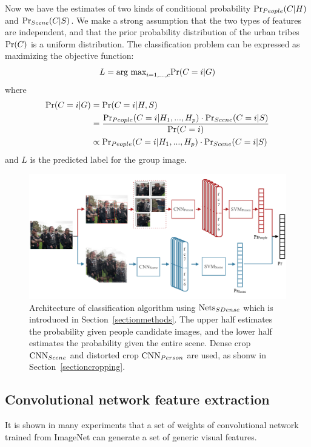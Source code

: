 \documentclass[10pt,twocolumn,letterpaper]{article}
\begin{document}
Now we have the estimates of two kinds of conditional probability $\textup{Pr}_{People}(C|H)$ and $\textup{Pr}_{Scene}(C|S)$. We make a strong assumption that the two types of features are independent, and that the prior probability distribution of the urban tribes $\textup{Pr}(C)$ is a uniform distribution. The classification problem can be expressed as maximizing the objective function:
\begin{equation}
L = \textup{arg max}_{i=1,...,c}\textup{Pr}(C=i|G)
\end{equation}
where
\begin{equation}
\begin{split}
 \textup{Pr}(C=i|G)& =\textup{Pr}(C=i|H, S) \\
  & = \frac{\textup{Pr}_{People}(C=i|H_{1},...,H_{p}) \cdot \textup{Pr}_{Scene}(C=i|S)}{\textup{Pr}(C=i)} \\
  & \propto \textup{Pr}_{People}(C=i|H_{1},...,H_{p}) \cdot \textup{Pr}_{Scene}(C=i|S)
\end{split}
\end{equation}
and $L$ is the predicted label for the group image. 


\begin{figure}[t]
\begin{center}
\includegraphics[width=0.8\linewidth]{flowchart2}
\end{center}
   \caption{Architecture of classification algorithm using $\textup{Nets}_{SDense}$ which is introduced in Section~\ref{sectionmethods}. The upper half estimates the probability given people candidate images, and the lower half estimates the probability given the entire scene. Dense crop $\textup{CNN}_{Scene}$ and distorted crop $\textup{CNN}_{Person}$ are used, as shonw in Section~\ref{sectioncropping}.}
\label{Flowchart}
\end{figure}



\subsection{Convolutional network feature extraction}
\label{sectioncnn}
It is shown in many experiments that a set of weights of convolutional network trained from ImageNet can generate a set of generic visual features.
\end{document}
